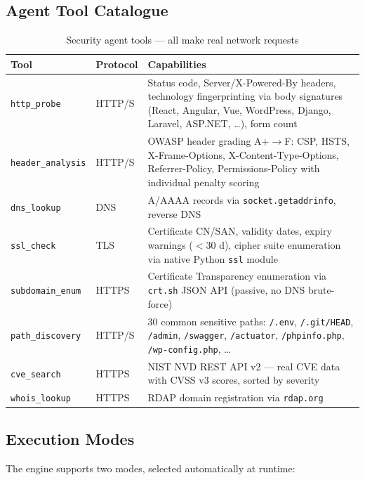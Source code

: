 \documentclass[12pt,a4paper]{article}
\begin{document}
\subsection{Agent Tool Catalogue}

\begin{table}[H]
\centering
\caption{Security agent tools --- all make real network requests}
\begin{tabular}{llp{7.5cm}}
\toprule
\textbf{Tool} & \textbf{Protocol} & \textbf{Capabilities} \\
\midrule
\texttt{http\_probe}      & HTTP/S & Status code, Server/X-Powered-By headers, technology fingerprinting via body signatures (React, Angular, Vue, WordPress, Django, Laravel, ASP.NET, \ldots{}), form count \\[4pt]
\texttt{header\_analysis} & HTTP/S & OWASP header grading A+$\to$F: CSP, HSTS, X-Frame-Options, X-Content-Type-Options, Referrer-Policy, Permissions-Policy with individual penalty scoring \\[4pt]
\texttt{dns\_lookup}      & DNS    & A/AAAA records via \texttt{socket.getaddrinfo}, reverse DNS \\[4pt]
\texttt{ssl\_check}       & TLS    & Certificate CN/SAN, validity dates, expiry warnings ($<$30 d), cipher suite enumeration via native Python \texttt{ssl} module \\[4pt]
\texttt{subdomain\_enum}  & HTTPS  & Certificate Transparency enumeration via \texttt{crt.sh} JSON API (passive, no DNS brute-force) \\[4pt]
\texttt{path\_discovery}  & HTTP/S & 30 common sensitive paths: \texttt{/.env}, \texttt{/.git/HEAD}, \texttt{/admin}, \texttt{/swagger}, \texttt{/actuator}, \texttt{/phpinfo.php}, \texttt{/wp-config.php}, \ldots{} \\[4pt]
\texttt{cve\_search}      & HTTPS  & NIST NVD REST API v2 --- real CVE data with CVSS v3 scores, sorted by severity \\[4pt]
\texttt{whois\_lookup}    & HTTPS  & RDAP domain registration via \texttt{rdap.org} \\
\bottomrule
\end{tabular}
\end{table}

\subsection{Execution Modes}

The engine supports two modes, selected automatically at runtime:
\end{document}
